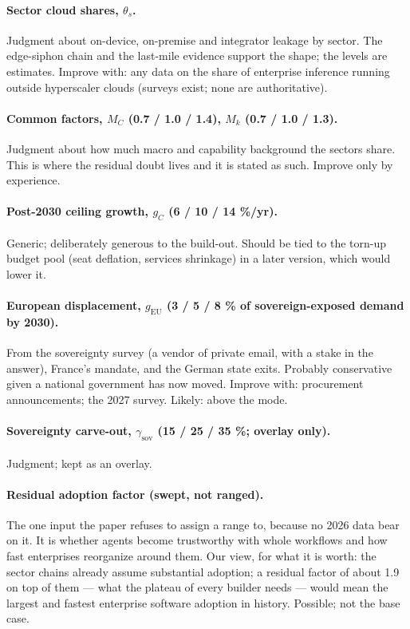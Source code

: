 \documentclass[11pt,letterpaper]{article}
\begin{document}
\paragraph{Sector cloud shares, $\theta_s$.} Judgment about on-device, on-premise and integrator leakage by sector. The edge-siphon chain and the last-mile evidence support the shape; the levels are estimates. Improve with: any data on the share of enterprise inference running outside hyperscaler clouds (surveys exist; none are authoritative).

\paragraph{Common factors, $M_C$ (0.7 / 1.0 / 1.4), $M_k$ (0.7 / 1.0 / 1.3).} Judgment about how much macro and capability background the sectors share. This is where the residual doubt lives and it is stated as such. Improve only by experience.

\paragraph{Post-2030 ceiling growth, $g_C$ (6 / 10 / 14 \%/yr).} Generic; deliberately generous to the build-out. Should be tied to the torn-up budget pool (seat deflation, services shrinkage) in a later version, which would lower it.

\paragraph{European displacement, $g_{\text{EU}}$ (3 / 5 / 8 \% of sovereign-exposed demand by 2030).} From the sovereignty survey (a vendor of private email, with a stake in the answer), France's mandate, and the German state exits. Probably conservative given a national government has now moved. Improve with: procurement announcements; the 2027 survey. Likely: above the mode.

\paragraph{Sovereignty carve-out, $\gamma_{\text{sov}}$ (15 / 25 / 35 \%; overlay only).} Judgment; kept as an overlay.

\paragraph{Residual adoption factor (swept, not ranged).} The one input the paper refuses to assign a range to, because no 2026 data bear on it. It is whether agents become trustworthy with whole workflows and how fast enterprises reorganize around them. Our view, for what it is worth: the sector chains already assume substantial adoption; a residual factor of about 1.9 on top of them --- what the plateau of every builder needs --- would mean the largest and fastest enterprise software adoption in history. Possible; not the base case.
\end{document}
